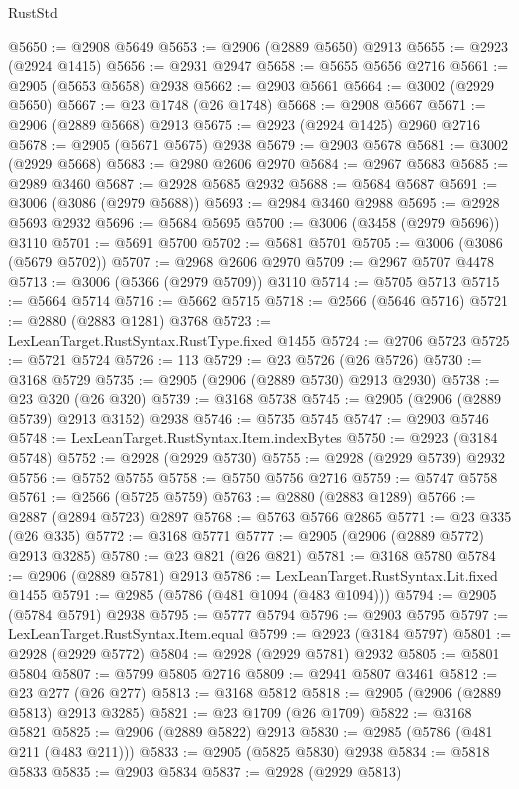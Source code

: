 \begin{lexlean}{RustStd}
\begin{coremodule}
@5650 := @2908 @5649
@5653 := @2906 (@2889 @5650) @2913
@5655 := @2923 (@2924 @1415)
@5656 := @2931 @2947
@5658 := @5655 @5656 @2716
@5661 := @2905 (@5653 @5658) @2938
@5662 := @2903 @5661
@5664 := @3002 (@2929 @5650)
@5667 := @23 @1748 (@26 @1748)
@5668 := @2908 @5667
@5671 := @2906 (@2889 @5668) @2913
@5675 := @2923 (@2924 @1425) @2960 @2716
@5678 := @2905 (@5671 @5675) @2938
@5679 := @2903 @5678
@5681 := @3002 (@2929 @5668)
@5683 := @2980 @2606 @2970
@5684 := @2967 @5683
@5685 := @2989 @3460
@5687 := @2928 @5685 @2932
@5688 := @5684 @5687
@5691 := @3006 (@3086 (@2979 @5688))
@5693 := @2984 @3460 @2988
@5695 := @2928 @5693 @2932
@5696 := @5684 @5695
@5700 := @3006 (@3458 (@2979 @5696)) @3110
@5701 := @5691 @5700
@5702 := @5681 @5701
@5705 := @3006 (@3086 (@5679 @5702))
@5707 := @2968 @2606 @2970
@5709 := @2967 @5707 @4478
@5713 := @3006 (@5366 (@2979 @5709)) @3110
@5714 := @5705 @5713
@5715 := @5664 @5714
@5716 := @5662 @5715
@5718 := @2566 (@5646 @5716)
@5721 := @2880 (@2883 @1281) @3768
@5723 := LexLeanTarget.RustSyntax.RustType.fixed @1455
@5724 := @2706 @5723
@5725 := @5721 @5724
@5726 := 113
@5729 := @23 @5726 (@26 @5726)
@5730 := @3168 @5729
@5735 := @2905 (@2906 (@2889 @5730) @2913 @2930)
@5738 := @23 @320 (@26 @320)
@5739 := @3168 @5738
@5745 := @2905 (@2906 (@2889 @5739) @2913 @3152) @2938
@5746 := @5735 @5745
@5747 := @2903 @5746
@5748 := LexLeanTarget.RustSyntax.Item.indexBytes
@5750 := @2923 (@3184 @5748)
@5752 := @2928 (@2929 @5730)
@5755 := @2928 (@2929 @5739) @2932
@5756 := @5752 @5755
@5758 := @5750 @5756 @2716
@5759 := @5747 @5758
@5761 := @2566 (@5725 @5759)
@5763 := @2880 (@2883 @1289)
@5766 := @2887 (@2894 @5723) @2897
@5768 := @5763 @5766 @2865
@5771 := @23 @335 (@26 @335)
@5772 := @3168 @5771
@5777 := @2905 (@2906 (@2889 @5772) @2913 @3285)
@5780 := @23 @821 (@26 @821)
@5781 := @3168 @5780
@5784 := @2906 (@2889 @5781) @2913
@5786 := LexLeanTarget.RustSyntax.Lit.fixed @1455
@5791 := @2985 (@5786 (@481 @1094 (@483 @1094)))
@5794 := @2905 (@5784 @5791) @2938
@5795 := @5777 @5794
@5796 := @2903 @5795
@5797 := LexLeanTarget.RustSyntax.Item.equal
@5799 := @2923 (@3184 @5797)
@5801 := @2928 (@2929 @5772)
@5804 := @2928 (@2929 @5781) @2932
@5805 := @5801 @5804
@5807 := @5799 @5805 @2716
@5809 := @2941 @5807 @3461
@5812 := @23 @277 (@26 @277)
@5813 := @3168 @5812
@5818 := @2905 (@2906 (@2889 @5813) @2913 @3285)
@5821 := @23 @1709 (@26 @1709)
@5822 := @3168 @5821
@5825 := @2906 (@2889 @5822) @2913
@5830 := @2985 (@5786 (@481 @211 (@483 @211)))
@5833 := @2905 (@5825 @5830) @2938
@5834 := @5818 @5833
@5835 := @2903 @5834
@5837 := @2928 (@2929 @5813)

\end{coremodule}
\end{lexlean}

